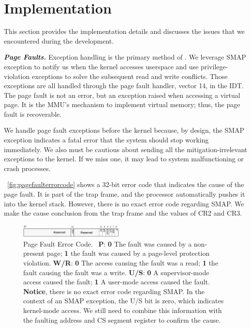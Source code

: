 

\section{Implementation}
\label{sec:ktoctou-implementation}

This section provides the implementation details and discusses the issues that we encountered during the development.


\textbf{\textit{Page Faults.}} Exception handling is the primary method of \name. We leverage SMAP exception to notify us when the kernel accesses userspace and use privilege-violation exceptions to solve the subsequent read and write conflicts. Those exceptions are all handled through the page fault handler, vector 14, in the IDT. The page fault is not an error, but an exception raised when accessing a virtual page. It is the MMU's mechanism to implement virtual memory; thus, the page fault is recoverable.

We handle page fault exceptions before the kernel because, by design, the SMAP exception indicates a fatal error that the system should stop working immediately. We also must be cautious about sending all the mitigation-irrelevant exceptions to the kernel. If we miss one, it may lead to system malfunctioning or crash processes.


~\autoref{fig:pagefaulterrorcode} shows a 32-bit error code that indicates the cause of the page fault. It is part of the trap frame, and the processor automatically pushes it into the kernel stack. However, there is no exact error code regarding SMAP.  We make the cause conclusion from the trap frame and the values of CR2 and CR3.


\begin{figure}[th]
  \includegraphics[width=0.47\textwidth]{figures/pagefaulterrorcode2}
  \centering
  \caption{Page Fault Error Code.~\cite{intelinterrupt} \textbf{P}: \textbf{0} The fault was caused by a non-present page; \textbf{1} the fault was caused by a page-level protection violation. \textbf{W/R}: \textbf{0} The access causing the fault was a read; \textbf{1} the fault causing the fault was a write. \textbf{U/S}: \textbf{0} A supervisor-mode access caused the fault; \textbf{1} A user-mode access caused the fault. \textbf{Notice}, there is no exact error code regarding SMAP. In the context of an SMAP exception, the U/S bit is zero, which indicates kernel-mode access. We still need to combine this information with the faulting address and CS segment register to confirm the cause.}
  \label{fig:pagefaulterrorcode}
\end{figure}


